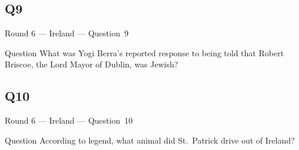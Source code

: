 \documentclass[11pt]{beamer}
\begin{document}
\subsection*{Q9}
\begin{frame}[t]{Round 6 --- Ireland --- \mbox{Question 9}}
\vspace{-0.5em}
\begin{block}{Question}
What was Yogi Berra's reported response to being told that Robert Briscoe, the Lord Mayor of Dublin, was Jewish?
\end{block}
\end{frame}
\subsection*{Q10}
\begin{frame}[t]{Round 6 --- Ireland --- \mbox{Question 10}}
\vspace{-0.5em}
\begin{block}{Question}
According to legend, what animal did St.\ Patrick drive out of Ireland?
\end{block}
\end{frame}
\end{document}
